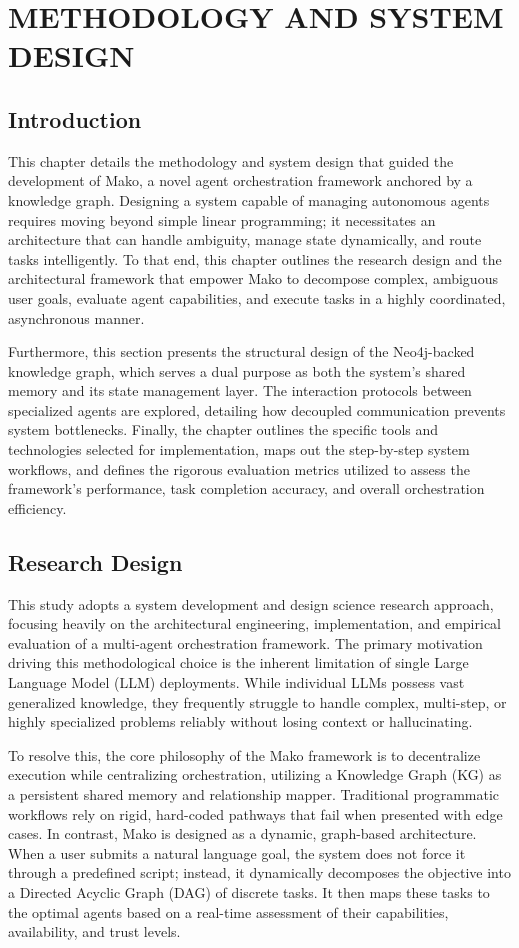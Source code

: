 \chapter{METHODOLOGY AND SYSTEM DESIGN}
\label{Chapter3}

\section{Introduction}
This chapter details the methodology and system design that guided the development of Mako, a novel agent orchestration framework anchored by a knowledge graph. Designing a system capable of managing autonomous agents requires moving beyond simple linear programming; it necessitates an architecture that can handle ambiguity, manage state dynamically, and route tasks intelligently. To that end, this chapter outlines the research design and the architectural framework that empower Mako to decompose complex, ambiguous user goals, evaluate agent capabilities, and execute tasks in a highly coordinated, asynchronous manner.

Furthermore, this section presents the structural design of the Neo4j-backed knowledge graph, which serves a dual purpose as both the system’s shared memory and its state management layer. The interaction protocols between specialized agents are explored, detailing how decoupled communication prevents system bottlenecks. Finally, the chapter outlines the specific tools and technologies selected for implementation, maps out the step-by-step system workflows, and defines the rigorous evaluation metrics utilized to assess the framework's performance, task completion accuracy, and overall orchestration efficiency.

\section{Research Design}
This study adopts a system development and design science research approach, focusing heavily on the architectural engineering, implementation, and empirical evaluation of a multi-agent orchestration framework. The primary motivation driving this methodological choice is the inherent limitation of single Large Language Model (LLM) deployments. While individual LLMs possess vast generalized knowledge, they frequently struggle to handle complex, multi-step, or highly specialized problems reliably without losing context or hallucinating.

To resolve this, the core philosophy of the Mako framework is to decentralize execution while centralizing orchestration, utilizing a Knowledge Graph (KG) as a persistent shared memory and relationship mapper. Traditional programmatic workflows rely on rigid, hard-coded pathways that fail when presented with edge cases. In contrast, Mako is designed as a dynamic, graph-based architecture. When a user submits a natural language goal, the system does not force it through a predefined script; instead, it dynamically decomposes the objective into a Directed Acyclic Graph (DAG) of discrete tasks. It then maps these tasks to the optimal agents based on a real-time assessment of their capabilities, availability, and trust levels.

